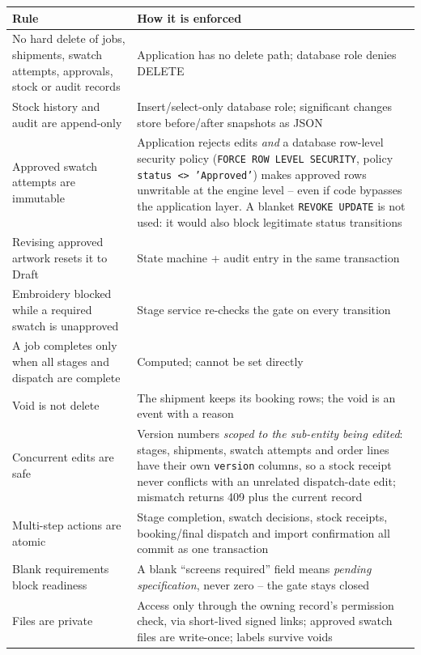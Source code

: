 \begin{tabularx}{\textwidth}{@{}X X@{}}
\toprule
\textbf{Rule} & \textbf{How it is enforced} \\
\midrule
No hard delete of jobs, shipments, swatch attempts, approvals, stock or audit records &
  Application has no delete path; database role denies DELETE \\
Stock history and audit are append-only & Insert/select-only database role; significant
  changes store before/after snapshots as JSON \\
Approved swatch attempts are immutable & Application rejects edits \emph{and} a
  database row-level security policy (\texttt{FORCE ROW LEVEL SECURITY}, policy
  \texttt{status <> 'Approved'}) makes approved rows unwritable at the engine level --
  even if code bypasses the application layer. A blanket \texttt{REVOKE UPDATE} is not
  used: it would also block legitimate status transitions \\
Revising approved artwork resets it to Draft & State machine + audit entry in the same
  transaction \\
Embroidery blocked while a required swatch is unapproved & Stage service re-checks the
  gate on every transition \\
A job completes only when all stages and dispatch are complete & Computed; cannot be set
  directly \\
Void is not delete & The shipment keeps its booking rows; the void is an event with a
  reason \\
Concurrent edits are safe & Version numbers \emph{scoped to the sub-entity being
  edited}: stages, shipments, swatch attempts and order lines have their own
  \texttt{version} columns, so a stock receipt never conflicts with an unrelated
  dispatch-date edit; mismatch returns 409 plus the current record \\
Multi-step actions are atomic & Stage completion, swatch decisions, stock receipts,
  booking/final dispatch and import confirmation all commit as one transaction \\
Blank requirements block readiness & A blank ``screens required'' field means
  \emph{pending specification}, never zero -- the gate stays closed \\
Files are private & Access only through the owning record's permission check, via
  short-lived signed links; approved swatch files are write-once; labels survive voids \\
\bottomrule
\end{tabularx}

